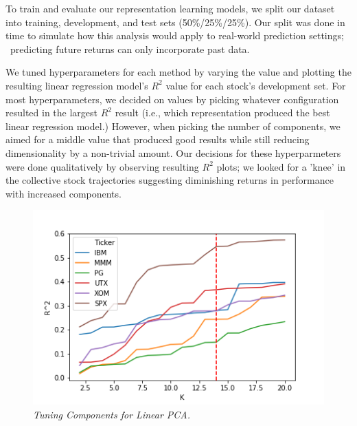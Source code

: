 \documentclass[a4paper]{article}
\begin{document}
   \par To train and evaluate our representation learning models, we split our dataset into training, development, and test sets (50\%/25\%/25\%). Our split was done in time to simulate how this analysis would apply to real-world prediction settings;  predicting future returns can only incorporate past data. 
   \par We tuned hyperparameters for each method by varying the value and plotting the resulting linear regression model's $R^2$ value for each stock's development set. For most hyperparameters, we decided on values by picking whatever configuration resulted in the largest $R^2$ result (i.e., which representation produced the best linear regression model.) However, when picking the number of components, we aimed for a middle value that produced good results while still reducing dimensionality by a non-trivial amount. Our decisions for these hyperparmeters were done qualitatively by observing resulting $R^2$ plots; we looked for a 'knee' in the collective stock trajectories suggesting diminishing returns in performance with increased components.
   
   \begin{figure}[t]
   	\centering
   	\includegraphics[width=\linewidth]{linPCA_tune.png}
   	\caption{{\it Tuning Components for Linear PCA.}}
   	\label{fig:LinPCATuning}
   \end{figure}
   
\end{document}
